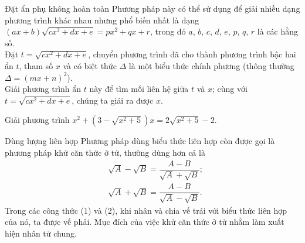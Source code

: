 \begin{dang}{Đặt ẩn phụ không hoàn toàn}
	Phương pháp này có thể sử dụng để giải nhiều dạng phương trình khác nhau nhưng phổ biến nhất là dạng $(ax+b)\sqrt{cx^2+dx+e}=px^2+qx+r$, trong đó $a$, $b$, $c$, $d$, $e$, $p$, $q$, $r$ là các hằng số.\\
	Đặt $t=\sqrt{cx^2+dx+e}$, chuyển phương trình đã cho thành phương trình bậc hai ẩn $t$, tham số $x$ và có biệt thức $\Delta$ là một biểu thức chính phương (thông thường $\Delta=(mx+n)^2$).\\
	Giải phương trình ẩn $t$ này để tìm mối liên hệ giữa $t$ và $x$; cùng với $t=\sqrt{cx^2+dx+e}$, chúng ta giải ra được $x$.
	
\end{dang}
\begin{vd}
	Giải phương trình $x^2+\left(3-\sqrt{x^2+5}\right)x=2\sqrt{x^2+5}-2$.
\end{vd}


\begin{dang}{Dùng lượng liên hợp}
	Phương pháp dùng biểu thức liên hợp còn được gọi là phương pháp khử căn thức ở tử, thường dùng hơn cả là 
	\begin{align*}
	&\sqrt{A}-\sqrt{B}=\dfrac{A-B}{\sqrt{A}+\sqrt{B}}; \tag{1}\\
	&\sqrt{A}+\sqrt{B}=\dfrac{A-B}{\sqrt{A}-\sqrt{B}}. \tag{2}
	\end{align*}
	Trong các công thức (1) và (2), khi nhân và chia vế trái với biểu thức liên hợp của nó, ta được vế phải. Mục đích của việc khử căn thức ở tử nhằm làm xuất hiện nhân tử chung.
\end{dang}

